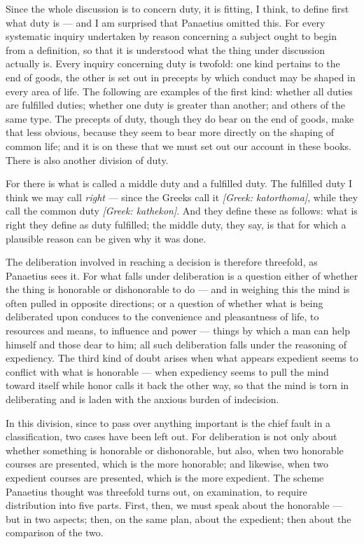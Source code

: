  Since the whole discussion is to concern duty, it is fitting, I think, to define first what duty is — and I am surprised that Panaetius omitted this. For every systematic inquiry undertaken by reason concerning a subject ought to begin from a definition, so that it is understood what the thing under discussion actually is. Every inquiry concerning duty is twofold: one kind pertains to the end of goods, the other is set out in precepts by which conduct may be shaped in every area of life. The following are examples of the first kind: whether all duties are fulfilled duties; whether one duty is greater than another; and others of the same type. The precepts of duty, though they do bear on the end of goods, make that less obvious, because they seem to bear more directly on the shaping of common life; and it is on these that we must set out our account in these books. There is also another division of duty.

 For there is what is called a middle duty and a fulfilled duty. The fulfilled duty I think we may call \textit{right} — since the Greeks call it \textit{[Greek: katorthoma]}, while they call the common duty \textit{[Greek: kathekon]}. And they define these as follows: what is right they define as duty fulfilled; the middle duty, they say, is that for which a plausible reason can be given why it was done.

 The deliberation involved in reaching a decision is therefore threefold, as Panaetius sees it. For what falls under deliberation is a question either of whether the thing is honorable or dishonorable to do — and in weighing this the mind is often pulled in opposite directions; or a question of whether what is being deliberated upon conduces to the convenience and pleasantness of life, to resources and means, to influence and power — things by which a man can help himself and those dear to him; all such deliberation falls under the reasoning of expediency. The third kind of doubt arises when what appears expedient seems to conflict with what is honorable — when expediency seems to pull the mind toward itself while honor calls it back the other way, so that the mind is torn in deliberating and is laden with the anxious burden of indecision.

 In this division, since to pass over anything important is the chief fault in a classification, two cases have been left out. For deliberation is not only about whether something is honorable or dishonorable, but also, when two honorable courses are presented, which is the more honorable; and likewise, when two expedient courses are presented, which is the more expedient. The scheme Panaetius thought was threefold turns out, on examination, to require distribution into five parts. First, then, we must speak about the honorable — but in two aspects; then, on the same plan, about the expedient; then about the comparison of the two.

